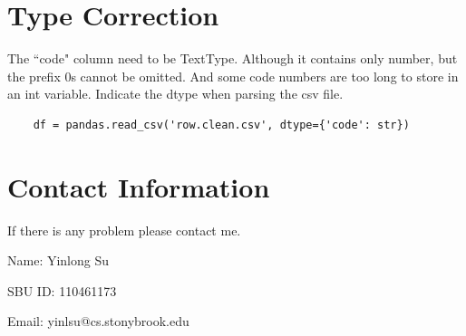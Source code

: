 \documentclass[11pt]{article}
\begin{document}
\section{Type Correction}

The ``code" column need to be TextType. Although it contains only number, but the prefix 0s cannot be omitted. And some code numbers are too long to store in an int variable. Indicate the dtype when parsing the csv file.
\begin{verbatim}
    df = pandas.read_csv('row.clean.csv', dtype={'code': str})
\end{verbatim}


\section{Contact Information}
If there is any problem please contact me.
\par
Name: Yinlong Su
\par
SBU ID: 110461173
\par
Email: yinlsu@cs.stonybrook.edu
\end{document}
